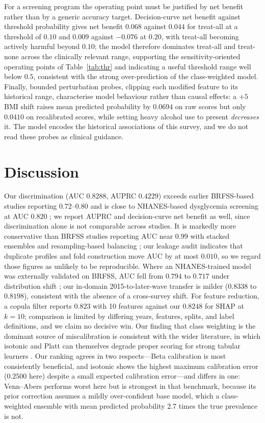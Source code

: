 \documentclass[conference]{IEEEtran}
\begin{document}
For a screening program the operating point must be justified by net benefit rather than by a generic accuracy target. Decision-curve net benefit against threshold probability gives net benefit $0.068$ against $0.044$ for treat-all at a threshold of $0.10$ and $0.009$ against $-0.076$ at $0.20$, with treat-all becoming actively harmful beyond $0.10$; the model therefore dominates treat-all and treat-none across the clinically relevant range, supporting the sensitivity-oriented operating points of Table~\ref{tab:thr} and indicating a useful threshold range well below $0.5$, consistent with the strong over-prediction of the class-weighted model. Finally, bounded perturbation probes, clipping each modified feature to its historical range, characterise model behaviour rather than causal effects: a $+5$ BMI shift raises mean predicted probability by $0.0694$ on raw scores but only $0.0410$ on recalibrated scores, while setting heavy alcohol use to present \emph{decreases} it. The model encodes the historical associations of this survey, and we do not read these probes as clinical guidance.

\section{Discussion}

Our discrimination (AUC $0.8288$, AUPRC $0.4229$) exceeds earlier BRFSS-based studies reporting 0.72--0.80 \cite{xie2019} and is close to NHANES-based dysglycemia screening at AUC $0.820$ \cite{sun2026beyond}; we report AUPRC and decision-curve net benefit as well, since discrimination alone is not comparable across studies. It is markedly more conservative than BRFSS studies reporting AUC near $0.99$ with stacked ensembles and resampling-based balancing \cite{pall2026comprehensive}; our leakage audit indicates that duplicate profiles and fold construction move AUC by at most $0.010$, so we regard those figures as unlikely to be reproducible. Where an NHANES-trained model was externally validated on BRFSS, AUC fell from $0.794$ to $0.717$ under distribution shift \cite{pall2026comprehensive}; our in-domain 2015-to-later-wave transfer is milder ($0.8338$ to $0.8198$), consistent with the absence of a cross-survey shift. For feature reduction, a copula filter reports $0.823$ with 10 features \cite{aich2026copula} against our $0.8248$ for SHAP at $k=10$; comparison is limited by differing years, features, splits, and label definitions, and we claim no decisive win. Our finding that class weighting is the dominant source of miscalibration is consistent with the wider literature, in which isotonic and Platt can themselves degrade proper scoring for strong tabular learners \cite{calibbench}. Our ranking agrees in two respects---Beta calibration is most consistently beneficial, and isotonic shows the highest maximum calibration error ($0.2500$ here) despite a small expected calibration error---and differs in one: Venn--Abers performs worst here but is strongest in that benchmark, because its prior correction assumes a mildly over-confident base model, which a class-weighted ensemble with mean predicted probability $2.7$ times the true prevalence is not.
\end{document}
